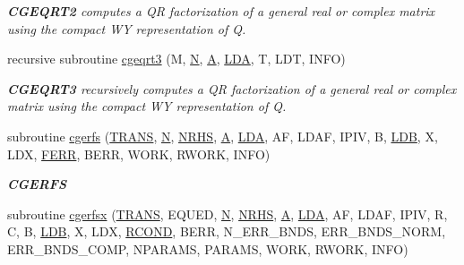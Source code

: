 \begin{DoxyCompactItemize}
\begin{DoxyCompactList}\small\item\em {\bfseries C\+G\+E\+Q\+R\+T2} computes a Q\+R factorization of a general real or complex matrix using the compact W\+Y representation of Q. \end{DoxyCompactList}\item 
recursive subroutine \hyperlink{group__complexGEcomputational_ga3ce7c8f1eb723ddba558d46a3e518635}{cgeqrt3} (M, \hyperlink{polmisc_8c_a0240ac851181b84ac374872dc5434ee4}{N}, \hyperlink{classA}{A}, \hyperlink{example__user_8c_ae946da542ce0db94dced19b2ecefd1aa}{L\+D\+A}, T, L\+D\+T, I\+N\+F\+O)
\begin{DoxyCompactList}\small\item\em {\bfseries C\+G\+E\+Q\+R\+T3} recursively computes a Q\+R factorization of a general real or complex matrix using the compact W\+Y representation of Q. \end{DoxyCompactList}\item 
subroutine \hyperlink{group__complexGEcomputational_gaf0690c8f23f60ff8ecc35033ff5aee86}{cgerfs} (\hyperlink{superlu__enum__consts_8h_a0c4e17b2d5cea33f9991ccc6a6678d62a1f61e3015bfe0f0c2c3fda4c5a0cdf58}{T\+R\+A\+N\+S}, \hyperlink{polmisc_8c_a0240ac851181b84ac374872dc5434ee4}{N}, \hyperlink{example__user_8c_aa0138da002ce2a90360df2f521eb3198}{N\+R\+H\+S}, \hyperlink{classA}{A}, \hyperlink{example__user_8c_ae946da542ce0db94dced19b2ecefd1aa}{L\+D\+A}, A\+F, L\+D\+A\+F, I\+P\+I\+V, B, \hyperlink{example__user_8c_a50e90a7104df172b5a89a06c47fcca04}{L\+D\+B}, X, L\+D\+X, \hyperlink{superlu__enum__consts_8h_af00a42ecad444bbda75cde1b64bd7e72a78fd14d7abebae04095cfbe02928f153}{F\+E\+R\+R}, B\+E\+R\+R, W\+O\+R\+K, R\+W\+O\+R\+K, I\+N\+F\+O)
\begin{DoxyCompactList}\small\item\em {\bfseries C\+G\+E\+R\+F\+S} \end{DoxyCompactList}\item 
subroutine \hyperlink{group__complexGEcomputational_ga1cc6317bb51919b658efa7bc80f286c2}{cgerfsx} (\hyperlink{superlu__enum__consts_8h_a0c4e17b2d5cea33f9991ccc6a6678d62a1f61e3015bfe0f0c2c3fda4c5a0cdf58}{T\+R\+A\+N\+S}, E\+Q\+U\+E\+D, \hyperlink{polmisc_8c_a0240ac851181b84ac374872dc5434ee4}{N}, \hyperlink{example__user_8c_aa0138da002ce2a90360df2f521eb3198}{N\+R\+H\+S}, \hyperlink{classA}{A}, \hyperlink{example__user_8c_ae946da542ce0db94dced19b2ecefd1aa}{L\+D\+A}, A\+F, L\+D\+A\+F, I\+P\+I\+V, R, C, B, \hyperlink{example__user_8c_a50e90a7104df172b5a89a06c47fcca04}{L\+D\+B}, X, L\+D\+X, \hyperlink{superlu__enum__consts_8h_af00a42ecad444bbda75cde1b64bd7e72a9b5c151728d8512307565994c89919d5}{R\+C\+O\+N\+D}, B\+E\+R\+R, N\+\_\+\+E\+R\+R\+\_\+\+B\+N\+D\+S, E\+R\+R\+\_\+\+B\+N\+D\+S\+\_\+\+N\+O\+R\+M, E\+R\+R\+\_\+\+B\+N\+D\+S\+\_\+\+C\+O\+M\+P, N\+P\+A\+R\+A\+M\+S, P\+A\+R\+A\+M\+S, W\+O\+R\+K, R\+W\+O\+R\+K, I\+N\+F\+O)

\end{DoxyCompactItemize}
